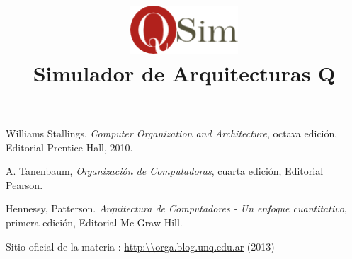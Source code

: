 \documentclass[10pt,a4paper]{article}
\author{\susi \and \tati}
\title{\includegraphics[width=4cm]{logoQSim.png}\\Simulador de Arquitecturas Q}
\begin{document}
\maketitle

\newpage
\tableofcontents

\newpage





\appendix




\begin{thebibliography}{9}

 Williams Stallings, \emph{Computer Organization and Architecture}, octava edición, Editorial Prentice Hall, 2010.

 A. Tanenbaum, \emph{Organización de Computadoras}, cuarta edición, Editorial Pearson.

 Hennessy, Patterson. \emph{Arquitectura de Computadores - Un enfoque cuantitativo}, primera edición,  Editorial Mc Graw Hill.

 Sitio oficial de la materia \orga: \url{http:\\orga.blog.unq.edu.ar} (2013)

\end{thebibliography}
\end{document}
